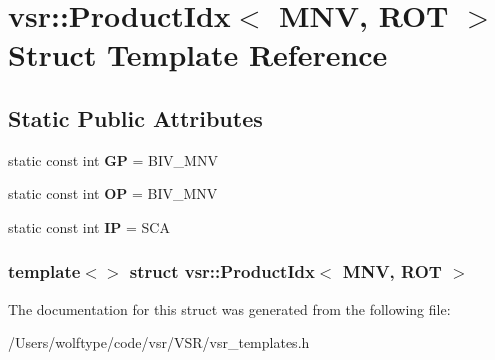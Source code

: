 \hypertarget{structvsr_1_1_product_idx_3_01_m_n_v_00_01_r_o_t_01_4}{\section{vsr\-:\-:Product\-Idx$<$ M\-N\-V, R\-O\-T $>$ Struct Template Reference}
\label{structvsr_1_1_product_idx_3_01_m_n_v_00_01_r_o_t_01_4}
}
\subsection*{Static Public Attributes}
\begin{DoxyCompactItemize}
\item 
\hypertarget{structvsr_1_1_product_idx_3_01_m_n_v_00_01_r_o_t_01_4_a3653f5534a7d626f9fa09f319f1b824b}{static const int {\bfseries G\-P} = B\-I\-V\-\_\-\-M\-N\-V}\label{structvsr_1_1_product_idx_3_01_m_n_v_00_01_r_o_t_01_4_a3653f5534a7d626f9fa09f319f1b824b}

\item 
\hypertarget{structvsr_1_1_product_idx_3_01_m_n_v_00_01_r_o_t_01_4_a9e1d4c49c9e69ff8325b8814b347bbaf}{static const int {\bfseries O\-P} = B\-I\-V\-\_\-\-M\-N\-V}\label{structvsr_1_1_product_idx_3_01_m_n_v_00_01_r_o_t_01_4_a9e1d4c49c9e69ff8325b8814b347bbaf}

\item 
\hypertarget{structvsr_1_1_product_idx_3_01_m_n_v_00_01_r_o_t_01_4_aa7d05d4e2aa46259313dfe6ed1e51522}{static const int {\bfseries I\-P} = S\-C\-A}\label{structvsr_1_1_product_idx_3_01_m_n_v_00_01_r_o_t_01_4_aa7d05d4e2aa46259313dfe6ed1e51522}

\end{DoxyCompactItemize}
\subsubsection*{template$<$$>$ struct vsr\-::\-Product\-Idx$<$ M\-N\-V, R\-O\-T $>$}



The documentation for this struct was generated from the following file\-:\begin{DoxyCompactItemize}
\item 
/\-Users/wolftype/code/vsr/\-V\-S\-R/vsr\-\_\-templates.\-h\end{DoxyCompactItemize}
